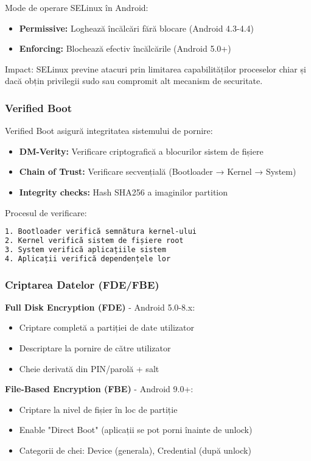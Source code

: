 \documentclass[11pt,a4paper,twocolumn]{article}
\theoremstyle{definition}
\theoremstyle{plain}
\theoremstyle{remark}
\begin{document}
Mode de operare SELinux în Android:
\begin{itemize}
    \item \textbf{Permissive:} Loghează încălcări fără blocare (Android 4.3-4.4)
    \item \textbf{Enforcing:} Blochează efectiv încălcările (Android 5.0+)
\end{itemize}

Impact: SELinux previne atacuri prin limitarea capabilităților proceselor chiar și 
dacă obțin privilegii sudo sau compromit alt mecanism de securitate.

\subsubsection{Verified Boot}
Verified Boot asigură integritatea sistemului de pornire:
\begin{itemize}
    \item \textbf{DM-Verity:} Verificare criptografică a blocurilor sistem de fișiere
    \item \textbf{Chain of Trust:} Verificare secvențială (Bootloader → Kernel → System)
    \item \textbf{Integrity checks:} Hash SHA256 a imaginilor partition
\end{itemize}

Procesul de verificare:
\begin{lstlisting}[language=bash, basicstyle=\ttfamily\tiny]
1. Bootloader verifică semnătura kernel-ului
2. Kernel verifică sistem de fișiere root
3. System verifică aplicațiile sistem
4. Aplicații verifică dependențele lor
\end{lstlisting}

\subsubsection{Criptarea Datelor (FDE/FBE)}
\textbf{Full Disk Encryption (FDE)} - Android 5.0-8.x:
\begin{itemize}
    \item Criptare completă a partiției de date utilizator
    \item Descriptare la pornire de către utilizator
    \item Cheie derivată din PIN/parolă + salt
\end{itemize}

\textbf{File-Based Encryption (FBE)} - Android 9.0+:
\begin{itemize}
    \item Criptare la nivel de fișier în loc de partiție
    \item Enable "Direct Boot" (aplicații se pot porni înainte de unlock)
    \item Categorii de chei: Device (generala), Credential (după unlock)
\end{itemize}
\end{document}
